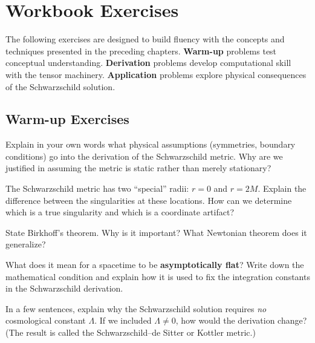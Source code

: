 \documentclass[12pt]{article}
\theoremstyle{definition}
\theoremstyle{remark}
\begin{document}
\section{Workbook Exercises}

The following exercises are designed to build fluency with the concepts and techniques
presented in the preceding chapters. \textbf{Warm-up} problems test conceptual
understanding. \textbf{Derivation} problems develop computational skill with the tensor
machinery. \textbf{Application} problems explore physical consequences of the
Schwarzschild solution.

\subsection*{Warm-up Exercises}

\begin{exbox}[label=ex:warmup1]
  Explain in your own words what physical assumptions (symmetries, boundary conditions)
  go into the derivation of the Schwarzschild metric. Why are we justified in assuming
  the metric is static rather than merely stationary?
\end{exbox}

\begin{exbox}[label=ex:warmup2]
  The Schwarzschild metric has two ``special'' radii: $r = 0$ and $r = 2M$.
  Explain the difference between the singularities at these locations. How
  can we determine which is a true singularity and which is a coordinate
  artifact?
\end{exbox}

\begin{exbox}[label=ex:warmup3]
  State Birkhoff's theorem. Why is it important? What Newtonian theorem
  does it generalize?
\end{exbox}

\begin{exbox}[label=ex:warmup4]
  What does it mean for a spacetime to be \textbf{asymptotically flat}?
  Write down the mathematical condition and explain how it is used to
  fix the integration constants in the Schwarzschild derivation.
\end{exbox}

\begin{exbox}[label=ex:warmup5]
  In a few sentences, explain why the Schwarzschild solution requires \emph{no}
  cosmological constant $\Lambda$. If we included $\Lambda \neq 0$, how would the
  derivation change? (The result is called the Schwarzschild--de Sitter or
  Kottler metric.)
\end{exbox}
\end{document}
